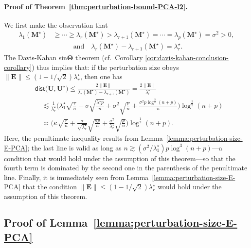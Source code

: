 \paragraph{Proof of Theorem~\ref{thm:perturbation-bound-PCA-l2}.}
We first make the observation that
%
\begin{align*}
\lambda_{1}(\bm{M}^{\star}) & \geq\cdots\geq\lambda_{r}(\bm{M}^{\star})>\lambda_{r+1}(\bm{M}^{\star})=\cdots=\lambda_{p}(\bm{M}^{\star})=\sigma^{2}>0,\\
 & \qquad\quad\text{and}\quad \lambda_{r}(\bm{M}^{\star})-\lambda_{r+1}(\bm{M}^{\star})=\lambda_{r}^{\star}.
\end{align*}
%
The Davis-Kahan sin$\bm{\Theta}$ theorem (cf.~Corollary \ref{cor:davis-kahan-conclusion-corollary})
thus implies that: if the perturbation size obeys $\|\bm{E}\|\leq(1-1/\sqrt{2})\lambda_{r}^{\star}$,
then one has
%
\begin{align*}
 & \mathsf{dist}\big(\bm{U},\bm{U}^{\star}\big)  \leq\frac{2\|\bm{E}\|}{\lambda_{r}(\bm{M}^{\star})-\lambda_{r+1}(\bm{M}^{\star})}=\frac{2\|\bm{E}\|}{\lambda_{r}^{\star}}\\
	& \quad \lesssim \frac{1}{\lambda_{r}^{\star}}\Bigg(\lambda_{1}^{\star}\sqrt{\frac{r}{n}}+\sigma\sqrt{\frac{\lambda_{1}^{\star}p}{n}}+\sigma^{2}\sqrt{\frac{p}{n}} + \frac{\sigma^{2}p\log^{\frac{3}{2}}(n+p)}{n} \Bigg)\log^{\frac{1}{2}}(n+p) \\
	& \quad \asymp \Bigg(\kappa\sqrt{\frac{r}{n}}+\frac{\sigma}{\sqrt{\lambda_{r}^{\star}}}\sqrt{\frac{\kappa p}{n}}+\frac{\sigma^{2}}{\lambda_{r}^{\star}}\sqrt{\frac{p}{n}}  \Bigg)\log^{\frac{1}{2}}(n+p) .
\end{align*}
%
Here, the penultimate inequality results from Lemma~\ref{lemma:perturbation-size-E-PCA};
the last line is valid as long as $n\gtrsim (\sigma^2 / \lambda_{1}^{\star}) p\log^{3}(n+p)$---a condition that would hold under the assumption of this theorem---so that the fourth term is dominated by the second one in the parenthesis of the penultimate line. Finally, it is immediately seen from Lemma~\ref{lemma:perturbation-size-E-PCA}
that the condition $\|\bm{E}\|\leq(1-1/\sqrt{2})\lambda_{r}^{\star}$ would hold
under the assumption of this theorem.
%










\subsection{Proof of Lemma~\ref{lemma:perturbation-size-E-PCA}}
\label{sec:proof-lemmas:perturbation-size-E-PCA}


